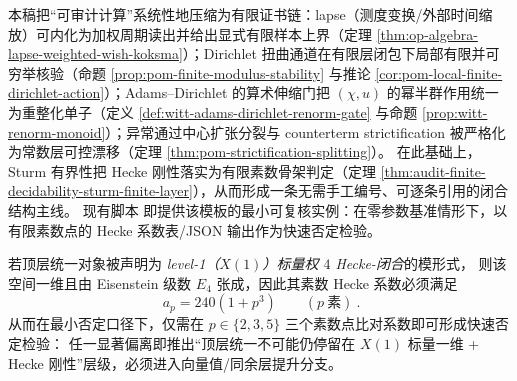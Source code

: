 \begin{remark}\label{rem:audit-summary-lapse-dirichlet-adams-sturm}
本稿把“可审计计算”系统性地压缩为有限证书链：lapse（测度变换/外部时间缩放）可内化为加权周期读出并给出显式有限样本上界（定理 \ref{thm:op-algebra-lapse-weighted-wish-koksma}）；Dirichlet 扭曲通道在有限层闭包下局部有限并可穷举核验（命题 \ref{prop:pom-finite-modulus-stability} 与推论 \ref{cor:pom-local-finite-dirichlet-action}）；Adams--Dirichlet 的算术伸缩门把 \((\chi,u)\) 的幂半群作用统一为重整化单子（定义 \ref{def:witt-adams-dirichlet-renorm-gate} 与命题 \ref{prop:witt-renorm-monoid}）；异常通过中心扩张分裂与 counterterm strictification 被严格化为常数层可控漂移（定理 \ref{thm:pom-strictification-splitting}）。
在此基础上，Sturm 有界性把 Hecke 刚性落实为有限素数骨架判定（定理 \ref{thm:audit-finite-decidability-sturm-finite-layer}），从而形成一条无需手工编号、可逐条引用的闭合结构主线。
现有脚本 \texttt{} 即提供该模板的最小可复核实例：在零参数基准情形下，以有限素数点的 Hecke 系数表/JSON 输出作为快速否定检验。
\end{remark}

\begin{corollary}\label{cor:hecke-e4-three-prime-refutation}
若顶层统一对象被声明为 \emph{level-1（\(X(1)\)）标量权 \(4\) Hecke-闭合}的模形式，
则该空间一维且由 Eisenstein 级数 \(E_4\) 张成，因此其素数 Hecke 系数必须满足
\[
\boxed{\ a_p=240(1+p^3)\qquad(p\ \text{素})\ }.
\]
从而在最小否定口径下，仅需在 \(p\in\{2,3,5\}\) 三个素数点比对系数即可形成快速否定检验：
任一显著偏离即推出“顶层统一不可能仍停留在 \(X(1)\) 标量一维 + Hecke 刚性”层级，必须进入向量值/同余层提升分支。
\end{corollary}


